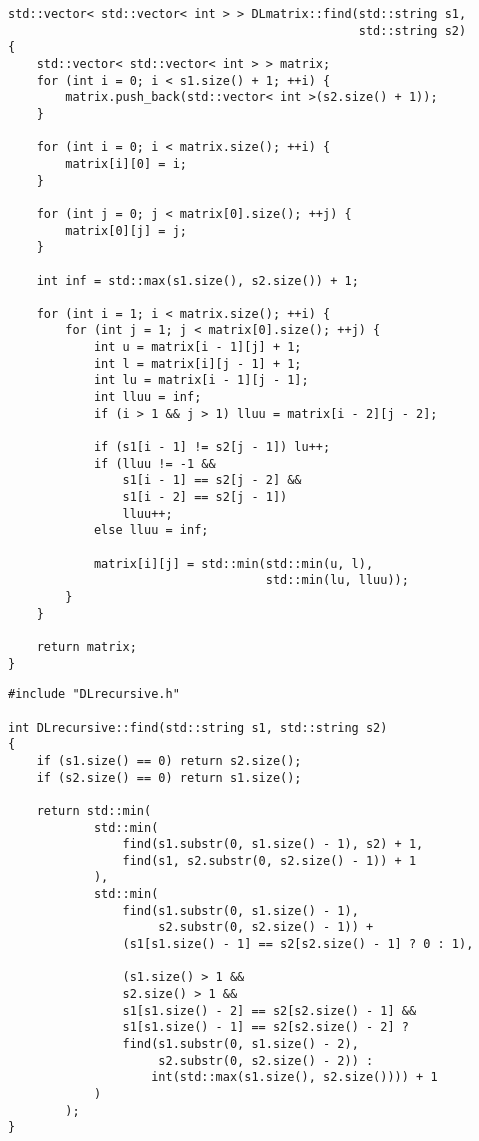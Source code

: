 ﻿\documentclass[a4paper,12pt]{article}
\begin{document}
    \begin{lstlisting}[caption=Дамерау-Левенштейна матричный]
std::vector< std::vector< int > > DLmatrix::find(std::string s1,
                                                 std::string s2)
{
    std::vector< std::vector< int > > matrix;
    for (int i = 0; i < s1.size() + 1; ++i) {
        matrix.push_back(std::vector< int >(s2.size() + 1));
    }

    for (int i = 0; i < matrix.size(); ++i) {
        matrix[i][0] = i;
    }

    for (int j = 0; j < matrix[0].size(); ++j) {
        matrix[0][j] = j;
    }

    int inf = std::max(s1.size(), s2.size()) + 1;

    for (int i = 1; i < matrix.size(); ++i) {
        for (int j = 1; j < matrix[0].size(); ++j) {
            int u = matrix[i - 1][j] + 1;
            int l = matrix[i][j - 1] + 1;
            int lu = matrix[i - 1][j - 1];
            int lluu = inf;
            if (i > 1 && j > 1) lluu = matrix[i - 2][j - 2];

            if (s1[i - 1] != s2[j - 1]) lu++;
            if (lluu != -1 && 
                s1[i - 1] == s2[j - 2] && 
                s1[i - 2] == s2[j - 1]) 
                lluu++;
            else lluu = inf;

            matrix[i][j] = std::min(std::min(u, l), 
                                    std::min(lu, lluu));
        }
    }

    return matrix;
}
    \end{lstlisting}

    \begin{lstlisting}[caption=Дамерау-Левенштейна рекурсивный]
#include "DLrecursive.h"

int DLrecursive::find(std::string s1, std::string s2)
{
    if (s1.size() == 0) return s2.size();
    if (s2.size() == 0) return s1.size();

    return std::min(
            std::min(
                find(s1.substr(0, s1.size() - 1), s2) + 1,
                find(s1, s2.substr(0, s2.size() - 1)) + 1
            ),
            std::min(
                find(s1.substr(0, s1.size() - 1), 
                     s2.substr(0, s2.size() - 1)) + 
                (s1[s1.size() - 1] == s2[s2.size() - 1] ? 0 : 1),

                (s1.size() > 1 && 
                s2.size() > 1 && 
                s1[s1.size() - 2] == s2[s2.size() - 1] && 
                s1[s1.size() - 1] == s2[s2.size() - 2] ?
                find(s1.substr(0, s1.size() - 2), 
                     s2.substr(0, s2.size() - 2)) : 
                    int(std::max(s1.size(), s2.size()))) + 1
            )
        );
}

    \end{lstlisting}
\end{document}
